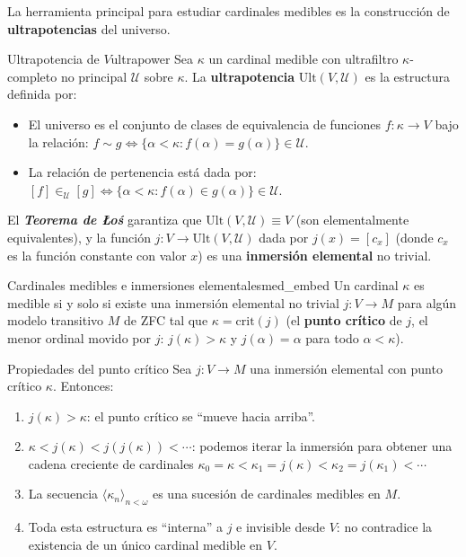 La herramienta principal para estudiar cardinales medibles es la construcción de \textbf{ultrapotencias} del universo.

\begin{definicion}{Ultrapotencia de $V$}{ultrapower}
Sea $\kappa$ un cardinal medible con ultrafiltro $\kappa$-completo no principal $\mathcal{U}$ sobre $\kappa$. La \textbf{ultrapotencia} $\mathrm{Ult}(V, \mathcal{U})$ es la estructura definida por:
\begin{itemize}[leftmargin=2em]
  \item El universo es el conjunto de clases de equivalencia de funciones $f: \kappa \to V$ bajo la relación: $f \sim g \iff \{\alpha < \kappa : f(\alpha) = g(\alpha)\} \in \mathcal{U}$.
  \item La relación de pertenencia está dada por: $[f] \in_{\mathcal{U}} [g] \iff \{\alpha < \kappa : f(\alpha) \in g(\alpha)\} \in \mathcal{U}$.
\end{itemize}
El \textbf{\textit{Teorema de Łoś}} garantiza que $\mathrm{Ult}(V, \mathcal{U}) \equiv V$ (son elementalmente equivalentes), y la función $j: V \to \mathrm{Ult}(V, \mathcal{U})$ dada por $j(x) = [c_x]$ (donde $c_x$ es la función constante con valor $x$) es una \textbf{inmersión elemental} no trivial.
\end{definicion}

\begin{teorema}{Cardinales medibles e inmersiones elementales}{med_embed}
Un cardinal $\kappa$ es medible si y solo si existe una inmersión elemental no trivial $j: V \to M$ para algún modelo transitivo $M$ de ZFC tal que $\kappa = \mathrm{crit}(j)$ (el \textbf{punto crítico} de $j$, el menor ordinal movido por $j$: $j(\kappa) > \kappa$ y $j(\alpha) = \alpha$ para todo $\alpha < \kappa$).
\end{teorema}

\begin{ejemplo}{Propiedades del punto crítico}{}
Sea $j: V \to M$ una inmersión elemental con punto crítico $\kappa$. Entonces:
\begin{enumerate}[leftmargin=2em, label=(\alph*)]
  \item $j(\kappa) > \kappa$: el punto crítico se ``mueve hacia arriba''.
  \item $\kappa < j(\kappa) < j(j(\kappa)) < \cdots$: podemos iterar la inmersión para obtener una cadena creciente de cardinales $\kappa_0 = \kappa < \kappa_1 = j(\kappa) < \kappa_2 = j(\kappa_1) < \cdots$
  \item La secuencia $\langle \kappa_n \rangle_{n < \omega}$ es una sucesión de cardinales medibles en $M$.
  \item Toda esta estructura es ``interna'' a $j$ e invisible desde $V$: no contradice la existencia de un único cardinal medible en $V$.
\end{enumerate}
\end{ejemplo}

